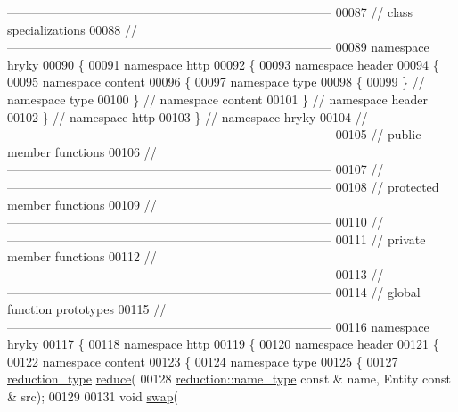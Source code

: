 \begin{DoxyCode}
{      ------------------------------------------------------------------------------}
00087 \textcolor{comment}{// class specializations}
00088 \textcolor{comment}{//
      ------------------------------------------------------------------------------}
00089 \textcolor{keyword}{namespace }hryky
00090 \{
00091 \textcolor{keyword}{namespace }http
00092 \{
00093 \textcolor{keyword}{namespace }header
00094 \{
00095 \textcolor{keyword}{namespace }content
00096 \{
00097 \textcolor{keyword}{namespace }type
00098 \{
00099 \} \textcolor{comment}{// namespace type}
00100 \} \textcolor{comment}{// namespace content}
00101 \} \textcolor{comment}{// namespace header}
00102 \} \textcolor{comment}{// namespace http}
00103 \} \textcolor{comment}{// namespace hryky}
00104 \textcolor{comment}{//
      ------------------------------------------------------------------------------}
00105 \textcolor{comment}{// public member functions}
00106 \textcolor{comment}{//
      ------------------------------------------------------------------------------}
00107 \textcolor{comment}{//
      ------------------------------------------------------------------------------}
00108 \textcolor{comment}{// protected member functions}
00109 \textcolor{comment}{//
      ------------------------------------------------------------------------------}
00110 \textcolor{comment}{//
      ------------------------------------------------------------------------------}
00111 \textcolor{comment}{// private member functions}
00112 \textcolor{comment}{//
      ------------------------------------------------------------------------------}
00113 \textcolor{comment}{//
      ------------------------------------------------------------------------------}
00114 \textcolor{comment}{// global function prototypes}
00115 \textcolor{comment}{//
      ------------------------------------------------------------------------------}
00116 \textcolor{keyword}{namespace }hryky
00117 \{
00118 \textcolor{keyword}{namespace }http
00119 \{
00120 \textcolor{keyword}{namespace }header
00121 \{
00122 \textcolor{keyword}{namespace }content
00123 \{
00124 \textcolor{keyword}{namespace }type
00125 \{
00127     \hyperlink{namespacehryky_a343a9a4c36a586be5c2693156200eadc}{reduction_type} \hyperlink{namespacehryky_1_1http_a08fc36a78a8e2908140fcd102829a566}{reduce}(
00128         \hyperlink{namespacehryky_1_1reduction_ac686c30a4c8d196bbd0f05629a6b921f}{reduction::name_type} \textcolor{keyword}{const} & name, Entity \textcolor{keyword}{const} & src);
00129 
00131     \textcolor{keywordtype}{void} \hyperlink{namespacehryky_1_1http_a38e62595ad532d18fbc65ceb61973aec}{swap}(

\end{DoxyCode}
